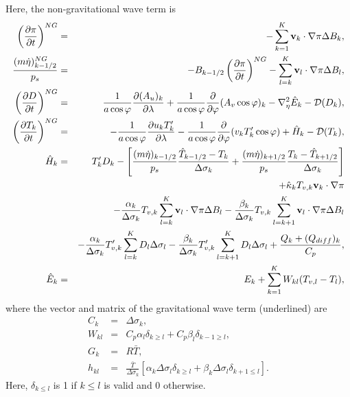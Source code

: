 Here, the non-gravitational wave term is
\begin{eqnarray}
  \left( \frac{\partial \pi}{\partial t} \right)^{NG}
   &=&   - \sum_{k=1}^{K} {\mathbf{v}}_{k} \cdot \nabla \pi
       \Delta B_{k}, \\
  \frac{(m\dot{\eta})^{NG}_{k-1/2}}{p_s}
 &=& - B_{k-1/2} \left( \frac{\partial \pi}{\partial t} \right)^{NG}
   - \sum_{l=k}^{K} {\mathbf{v}}_{l} \cdot \nabla \pi
       \Delta B_{l}, \\
  \left( \frac{\partial D}{\partial t} \right)^{NG}
       &=&   \frac{1}{a\cos\varphi}
            \frac{\partial (A_u)_{k}}{\partial \lambda}
          + \frac{1}{a\cos\varphi}
            \frac{\partial }{\partial \varphi} (A_v \cos\varphi)_k
          - \nabla^{2}_{\eta} \hat{E}_{k}
          - {\mathcal D}(D_{k}), \\
  \left( \frac{\partial T_{k}}{\partial t} \right)^{NG}
      &=&   - \frac{1}{a\cos\varphi}
               \frac{\partial u_k T'_k}{\partial \lambda}
          - \frac{1}{a\cos\varphi}
               \frac{\partial }{\partial \varphi} (v_k T'_k \cos\varphi)
          + \hat{H}_{k}
          - {\mathcal D}(T_{k}), \\
 \hat{H}_k  &=&  T_{k}^{\prime} D_{k} - \left[   \frac{(m\dot{\eta})_{k-1/2}}{p_s} \frac{\hat{T}_{k-1/2} - T_k}{\Delta\sigma_k}
               + \frac{(m\dot{\eta})_{k+1/2}}{p_s} \frac{T_k - \hat{T}_{k+1/2}}{\Delta\sigma_k} \right] \notag\\
         &&+ \hat{\kappa}_{k} T_{v,k} {\mathbf{v}}_{k} \cdot \nabla \pi \notag\\
         &&- \frac{\alpha_{k}}{\Delta \sigma_{k} } T_{v,k}
             \sum_{l=k}^{K} {\mathbf{v}}_{l} \cdot \nabla \pi 
               \Delta B_{l}
           - \frac{\beta_{k}}{\Delta \sigma_{k} } T_{v,k}
             \sum_{l=k+1}^{K} {\mathbf{v}}_{l} \cdot \nabla \pi 
               \Delta B_{l} \notag\\
        &&- \frac{\alpha_{k}}{\Delta \sigma_{k} } T'_{v,k}
             \sum_{l=k}^{K} D_l  \Delta \sigma_{l}
           - \frac{\beta_{k}}{\Delta \sigma_{k} } T'_{v,k}
             \sum_{l=k+1}^{K} D_l  \Delta \sigma_{l}
         + \frac{Q_k + (Q_{diff})_k}{C_p}, \\
  \hat{E}_k &=& E_{k}
            + \sum_{k=1}^{K} W_{kl} ( T_{v,l}-T_{l} ),
\end{eqnarray}
where the vector and matrix of the gravitational wave term (underlined)
are
\begin{eqnarray}
  C_{k} &=& \Delta \sigma_{k}, \\
  W_{kl} &=& C_{p} \alpha_{l} \delta_{k \geq l}
         + C_{p} \beta_{l} \delta_{k-1 \geq l}, \\
  G_{k} &=& R\bar{T}, \\
h_{kl} &=& \frac{\bar{T}}{\Delta\sigma_k}\left[\alpha_k \Delta\sigma_l \delta_{k\ge l}+\beta_k \Delta\sigma_l \delta_{k+1\le l}\right].
\end{eqnarray}
Here, \(\delta_{k \leq l}\) is 1 if \(k \leq l\) is valid and 0
otherwise.\\

